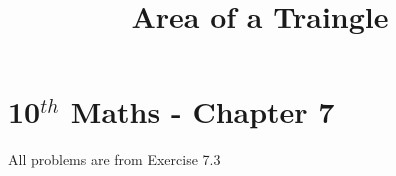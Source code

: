 \documentclass[12pt]{article}
\begin{document}
\begin{center}
\title{\textbf{Area of a Traingle}}
\date{\vspace{-5ex}} %
\maketitle
\end{center}

\setcounter{page}{1}



\section{10$^{th}$ Maths - Chapter 7}

All problems are from Exercise 7.3
\end{document}
